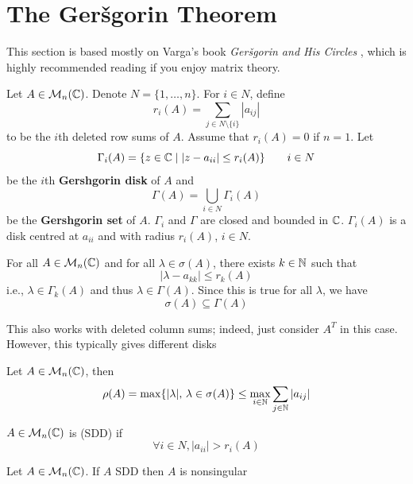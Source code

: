 \documentclass[aspectratio=169]{beamer}
\begin{document}
\section{The Ger\v{s}gorin Theorem}\label{sec:Gershgorin_in_evalues_chapter}

\begin{frame}
This section is based mostly on Varga's book \emph{Ger\v{s}gorin and His Circles} \cite{Varga2010}, which is highly recommended reading if you enjoy matrix theory.

Let $A\in \mathcal{M}_n(\mathbb{C})$. Denote $N=\{1,\ldots,n\} $. For $i\in N$, define 
\[r_i (A)= \sum\limits_{j\in N\setminus \{i\}} | a_{ij}|\]
to be
the $i$th deleted row sums of $A$. Assume that $r_i(A)=0$ if $n=1$. Let 
\[\Gamma_i(A)=\{z\in \mathbb{C} \mid |z-a_{ii}|\leq r_i(A)\} \qquad i\in N\]
 be the $i$th \textbf{Gershgorin disk} of $A$ and 
\[\Gamma(A)= \bigcup\limits_{i\in N} \Gamma_i (A)\]
be the \textbf{Gershgorin set} of $A$. $\Gamma_i$ and $\Gamma$ are closed and bounded in $\mathbb{C}$. $\Gamma_i(A)$ is a disk centred at $a_{ii}$ and with radius $r_i(A)$, $i\in N$.
\end{frame}


\begin{frame}
\begin{theorem}[Gershgorin, 1931]\label{th:Gershgorin}
For all $A\in \mathcal{M}_{n}(\mathbb{C})$ and for all $\lambda\in \sigma(A)$, there exists $k\in \mathbb{N}$ such that 
\[
  |\lambda -a_{kk}|\leq r_k(A)
\]
i.e., $\lambda\in \Gamma_k(A)$ and thus $\lambda \in \Gamma(A)$. Since this is true for all $\lambda$, we have 
\[
  \sigma(A)\subseteq \Gamma(A)
\]
\end{theorem}
\begin{remark}
This also works with deleted column sums; indeed, just consider $A^T$ in this case. However, this typically gives different disks
\end{remark}
\end{frame}


\begin{frame}
\begin{corollary}
Let $A\in \mathcal{M}_n(\mathbb{C})$, then 
\[
  \rho(A) = \max \{ | \lambda|, \, \lambda \in \sigma(A)\}\leq \max_{i\in\mathbb{N}} \sum\limits_{j\in\mathbb{N}} | a_{ij}|
\]
\end{corollary}


\begin{definition}
$A\in \mathcal{M}_n(\mathbb{C})$ is  (SDD) if 
\[
  \forall i \in N, | a_{ii} | > r_i(A)
\]
\end{definition}

\begin{theorem}
Let $A\in \mathcal{M}_n(\mathbb{C})$. If $A$ SDD then $A$ is nonsingular
\end{theorem}
\end{frame}
\end{document}
